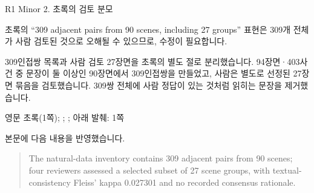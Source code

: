 \begin{reviewitem}{R1 Minor 2. 초록의 검토 분모}

\begin{reviewercomment}

초록의 ``309 adjacent pairs from 90 scenes, including 27 groups'' 표현은 309개 전체가 사람 검토된 것으로 오해될 수 있으므로, 수정이 필요합니다.

\end{reviewercomment}

\begin{authorresponse}

309인접쌍 목록과 사람 검토 27장면을 초록의 별도 절로 분리했습니다. 94장면·403사건 중 문장이 둘 이상인 90장면에서 309인접쌍을 만들었고, 사람은 별도로 선정된 27장면 묶음을 검토했습니다. 309쌍 전체에 사람 정답이 있는 것처럼 읽히는 문장을 제거했습니다.

\end{authorresponse}

\begin{manuscriptrevision}{영문 초록(1쪽); ; ; 아래 발췌: 1쪽}

본문에 다음 내용을 반영했습니다.

\begin{quote}

The natural-data inventory contains 309 adjacent pairs from 90 scenes; four reviewers assessed a selected subset of 27 scene groups, with textual-consistency Fleiss' kappa 0.027301 and no recorded consensus rationale.

\end{quote}

\end{manuscriptrevision}

\end{reviewitem}

\clearpage

